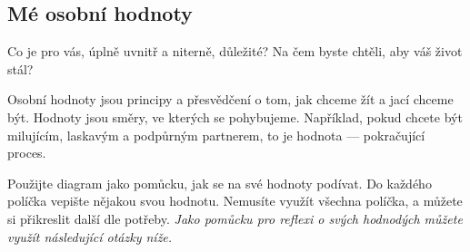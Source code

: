 	\subsection{Mé osobní hodnoty \normalPencilLeftDown}
		Co je pro vás, úplně uvnitř a niterně, důležité? Na čem byste chtěli, aby váš život stál?
		\begin{center}
		\end{center}

		Osobní hodnoty jsou principy a přesvědčení o tom, jak chceme žít a jací chceme být. Hodnoty jsou směry, ve kterých se pohybujeme. Například, pokud chcete být milujícím, laskavým a podpůrným partnerem, to je hodnota — pokračující proces.

		Použijte diagram jako pomůcku, jak se na své hodnoty podívat. Do každého políčka vepište nějakou svou hodnotu. Nemusíte využít všechna políčka, a můžete si přikreslit další dle potřeby. \emph{Jako pomůcku pro reflexi o svých hodnodých můžete využít následující otázky níže.}

